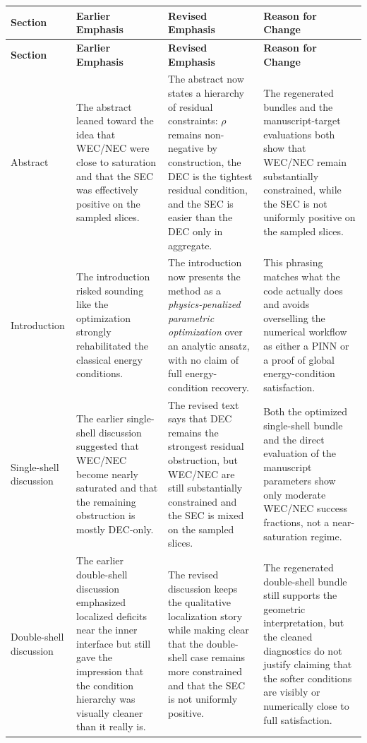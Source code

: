 \documentclass[11pt]{article}
\begin{document}
\renewcommand{\arraystretch}{1.25}
\begin{longtable}{p{} p{} p{} p{}}
\toprule
\textbf{Section} & \textbf{Earlier Emphasis} & \textbf{Revised Emphasis} & \textbf{Reason for Change} \\
\midrule
\endfirsthead
\toprule
\textbf{Section} & \textbf{Earlier Emphasis} & \textbf{Revised Emphasis} & \textbf{Reason for Change} \\
\midrule
\endhead
\bottomrule
\endfoot

Abstract &
The abstract leaned toward the idea that WEC/NEC were close to saturation and that the
SEC was effectively positive on the sampled slices. &
The abstract now states a hierarchy of residual constraints: $\rho$ remains non-negative by
construction, the DEC is the tightest residual condition, and the SEC is easier than the
DEC only in aggregate. &
The regenerated bundles and the manuscript-target evaluations both show that WEC/NEC remain
substantially constrained, while the SEC is not uniformly positive on the sampled slices. \\[0.2cm]

Introduction &
The introduction risked sounding like the optimization strongly rehabilitated the classical
energy conditions. &
The introduction now presents the method as a \emph{physics-penalized parametric optimization}
over an analytic ansatz, with no claim of full energy-condition recovery. &
This phrasing matches what the code actually does and avoids overselling the numerical workflow as
either a PINN or a proof of global energy-condition satisfaction. \\[0.2cm]

Single-shell discussion &
The earlier single-shell discussion suggested that WEC/NEC become nearly saturated and that the
remaining obstruction is mostly DEC-only. &
The revised text says that DEC remains the strongest residual obstruction, but WEC/NEC are
still substantially constrained and the SEC is mixed on the sampled slices. &
Both the optimized single-shell bundle and the direct evaluation of the manuscript parameters show
only moderate WEC/NEC success fractions, not a near-saturation regime. \\[0.2cm]

Double-shell discussion &
The earlier double-shell discussion emphasized localized deficits near the inner interface but
still gave the impression that the condition hierarchy was visually cleaner than it really is. &
The revised discussion keeps the qualitative localization story while making clear that the
double-shell case remains more constrained and that the SEC is not uniformly positive. &
The regenerated double-shell bundle still supports the geometric interpretation, but the cleaned
diagnostics do not justify claiming that the softer conditions are visibly or numerically close to
full satisfaction. \\[0.2cm]


\end{longtable}
\end{document}
